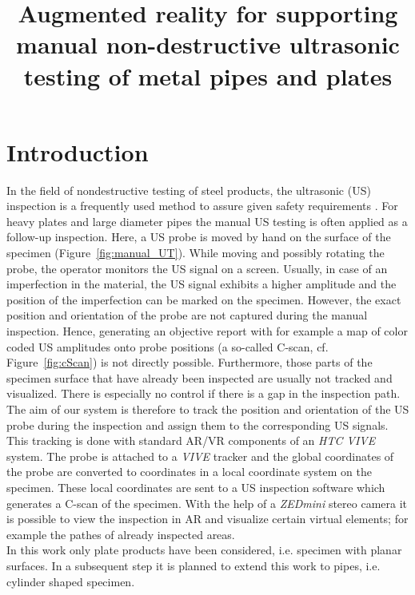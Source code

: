 \documentclass{VRARWorkshop}
\title{Augmented reality for supporting manual non-destructive ultrasonic testing of metal pipes and plates}
\begin{document}
\section{Introduction}

In the field of nondestructive testing of steel products, the ultrasonic (US) inspection is a frequently used method to assure given safety requirements \cite{deutsch_zfp_2010} \cite{moles_introduction_2004} \cite{olympus_Grundlagen}.
For heavy plates and large diameter pipes the manual US testing is often applied as a follow-up inspection. Here, a US probe is moved by hand on the surface of the specimen (Figure~\ref{fig:manual_UT}).
While moving and possibly rotating the probe, the operator monitors the US signal on a screen.
Usually, in case of an imperfection in the material, the US signal exhibits a higher amplitude and the position of the imperfection can be marked on the specimen.
However, the exact position and orientation of the probe are not captured during the manual inspection.
Hence, generating an objective report with for example a map of color coded US amplitudes onto probe positions (a so-called C-scan, cf. Figure~\ref{fig:cScan}) is not directly possible.
Furthermore, those parts of the specimen surface that have already been inspected are usually not tracked and visualized.
There is especially no control if there is a gap in the inspection path. \\
The aim of our system is therefore to track the position and orientation of the US probe during the inspection and assign them to the corresponding US signals.
This tracking is done with standard AR/VR components of an \textit{HTC VIVE} system.
The probe is attached to a \textit{VIVE} tracker and the global coordinates of the probe are converted to coordinates in a local coordinate system on the specimen. These local coordinates are sent to a US inspection software which generates a C-scan of the specimen.
With the help of a \textit{ZEDmini} stereo camera it is possible to view the inspection in AR and visualize certain virtual elements; for example the pathes of already inspected areas. \\
In this work only plate products have been considered, i.e. specimen with planar surfaces.
In a subsequent step it is planned to extend this work to pipes, i.e. cylinder shaped specimen.
\end{document}
